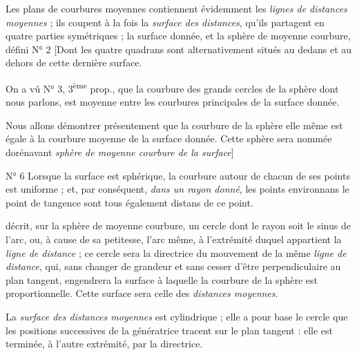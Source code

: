 \documentclass[11pt,a4paper]{article}
\begin{document}

Les plans de courbures moyennes contiennent évidemment les \emph{lignes de
distances moyennes} ; ils coupent à la fois la \emph{surface des distances},
qu'ils partagent en quatre parties symétriques ; la surface donnée, et la
sphère de moyenne courbure, défini N° 2 [Dont les quatre quadrans sont
alternativement situés au dedans et au dehors de cette dernière surface.

On a vû N° 3, 3\textsuperscript{ème} prop., que la courbure des grands cercles de
la sphère dont nous parlons, est moyenne entre les courbures principales de
la surface donnée.

Nous allons démontrer présentement que la courbure de la sphère elle même
est égale à la courbure moyenne de la surface donnée. Cette sphère sera
nommée dorénavant \emph{sphère de moyenne courbure de la surface}]


N° 6 Lorsque la surface est sphérique, la courbure autour de chacun de ses points
est uniforme ; et, par conséquent, \emph{dans un rayon donné}, les points
environnans le point de tangence sont tous également distans de ce point.

décrit, sur la sphère de moyenne courbure, un cercle dont le rayon soit le
sinus de l'arc, ou, à cause de sa petitesse, l'arc même, à l'extrémité
duquel appartient la \emph{ligne de distance} ; ce cercle sera la directrice
du mouvement de la même \emph{ligne de distance}, qui, sans changer de
grandeur et sans cesser d'être perpendiculaire au plan tangent, engendrera
la surface à laquelle la courbure de la sphère est proportionnelle. Cette
surface sera celle des \emph{distances moyennes}.


La \emph{surface des distances moyennes} est cylindrique ; elle a pour base
le cercle que les positions successives de la génératrice tracent sur le
plan tangent : elle est terminée, à l'autre extrémité, par la directrice.
\end{document}
